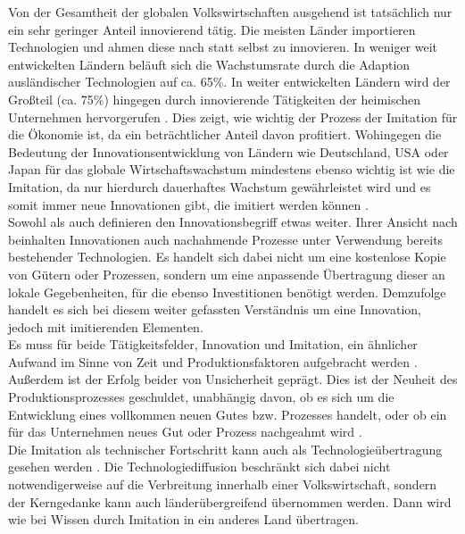 %
Von der Gesamtheit der globalen Volkswirtschaften ausgehend ist tatsächlich nur ein sehr geringer Anteil innovierend tätig. Die meisten Länder importieren Technologien und ahmen diese nach statt selbst zu innovieren. In weniger weit entwickelten Ländern beläuft sich die Wachstumsrate durch die Adaption ausländischer Technologien auf ca. 65{\%}. In weiter entwickelten Ländern wird der Großteil (ca. 75{\%}) hingegen durch innovierende Tätigkeiten der heimischen Unternehmen hervorgerufen \cite{Santacreu.2015}. Dies zeigt, wie wichtig der Prozess der Imitation für die Ökonomie ist, da ein beträchtlicher Anteil davon profitiert. Wohingegen die Bedeutung der Innovationsentwicklung von Ländern wie Deutschland, USA oder Japan für das globale Wirtschaftswachstum mindestens ebenso wichtig ist wie die Imitation, da nur hierdurch dauerhaftes Wachstum gewährleistet wird und es somit immer neue Innovationen gibt, die imitiert werden können \cite[Kapitel 18,S.642]{Acemoglu.2009}.\\
%
Sowohl \cite{Arrow.1969} als auch \cite{Evenson.1995} definieren den Innovationsbegriff etwas weiter. Ihrer Ansicht nach beinhalten Innovationen auch nachahmende Prozesse unter Verwendung bereits bestehender Technologien. Es handelt sich dabei nicht um eine kostenlose Kopie von Gütern oder Prozessen, sondern um eine anpassende Übertragung dieser an lokale Gegebenheiten, für die ebenso Investitionen benötigt werden. Demzufolge handelt es sich bei diesem weiter gefassten Verständnis um eine Innovation, jedoch mit imitierenden Elementen.\\
%
Es muss für beide Tätigkeitsfelder, Innovation und Imitation, ein ähnlicher Aufwand im Sinne von Zeit und Produktionsfaktoren aufgebracht werden \cite[S. 826]{Cohen.1989,Griffith.2004,Segerstrom.1991}. Außerdem ist der Erfolg beider von Unsicherheit geprägt. Dies ist der Neuheit des Produktionsprozesses geschuldet, unabhängig davon, ob es sich um die Entwicklung eines vollkommen neuen Gutes bzw. Prozesses handelt, oder ob ein  für das Unternehmen neues Gut oder Prozess nachgeahmt wird \cite[S. 826]{Segerstrom.1991}.\\
%
Die Imitation als technischer Fortschritt kann auch als Technologieübertragung gesehen werden \cite[S. 70]{Cohen.1989,Griffith.2004,Nelson.1966}. Die Technologiediffusion beschränkt sich dabei nicht notwendigerweise auf die Verbreitung innerhalb einer Volkswirtschaft, sondern der Kerngedanke kann auch länderübergreifend übernommen werden. Dann wird wie bei \cite{Nelson.1966} Wissen durch Imitation in ein anderes Land übertragen. \\

